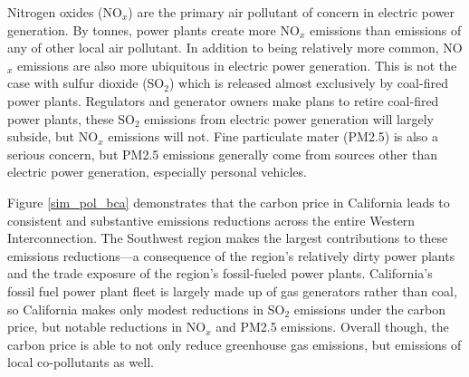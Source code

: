Nitrogen oxides (NO$_x$) are the primary air pollutant of concern in electric power generation. By tonnes, power plants create more NO$_x$ emissions than emissions of any of other local air pollutant. In addition to being relatively more common, NO$_x$ emissions are also more ubiquitous in electric power generation. This is not the case with sulfur dioxide (SO$_2$) which is released almost exclusively by coal-fired power plants. Regulators and generator owners make plans to retire coal-fired power plants, these SO$_2$ emissions from electric power generation will largely subside, but NO$_x$ emissions will not. Fine particulate mater (PM2.5) is also a serious concern, but PM2.5 emissions generally come from sources other than electric power generation, especially personal vehicles. 

Figure \ref{sim_pol_bca} demonstrates that the carbon price in California leads to consistent and substantive emissions reductions across the entire Western Interconnection. The Southwest region makes the largest contributions to these emissions reductions---a consequence of the region's relatively dirty power plants and the trade exposure of the region's fossil-fueled power plants. California's fossil fuel power plant fleet is largely made up of gas generators rather than coal, so California makes only modest reductions in SO$_2$ emissions under the carbon price, but notable reductions in NO$_x$ and PM2.5 emissions. Overall though, the carbon price is able to not only reduce greenhouse gas emissions, but emissions of local co-pollutants as well. 











